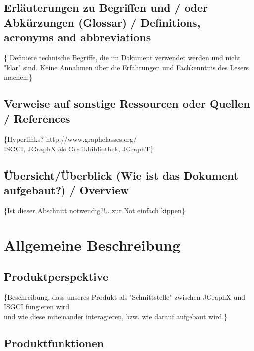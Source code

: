 \documentclass[11pt,a4paper]{article}
\begin{document}
  	\subsection{Erläuterungen zu Begriffen und / oder Abkürzungen (Glossar) / Definitions, acronyms and abbreviations} %
	\{        Definiere technische Begriffe, die im Dokument verwendet werden und nicht "klar" sind.
	        Keine Annahmen über die Erfahrungen und Fachkenntnis des Lesers machen.\}
  	\subsection{Verweise auf sonstige Ressourcen oder Quellen / References} %
  	\{Hyperlinks? http://www.graphclasses.org/\\
          ISGCI, JGraphX als Grafikbibliothek, JGraphT\}
  	\subsection{Übersicht/Überblick (Wie ist das Dokument aufgebaut?) / Overview} %
  	\{Ist dieser Abschnitt notwendig?!.. zur Not einfach kippen\}
  	
\newpage
\section{Allgemeine Beschreibung} %
  	\subsection{Produktperspektive} %
	\{Beschreibung, dass unseres Produkt als "Schnittstelle" zwischen JGraphX und ISGCI fungieren wird\\
	und wie diese miteinander interagieren, bzw. wie darauf aufgebaut wird.\}
  	\subsection{Produktfunktionen} %
  	
\end{document}
